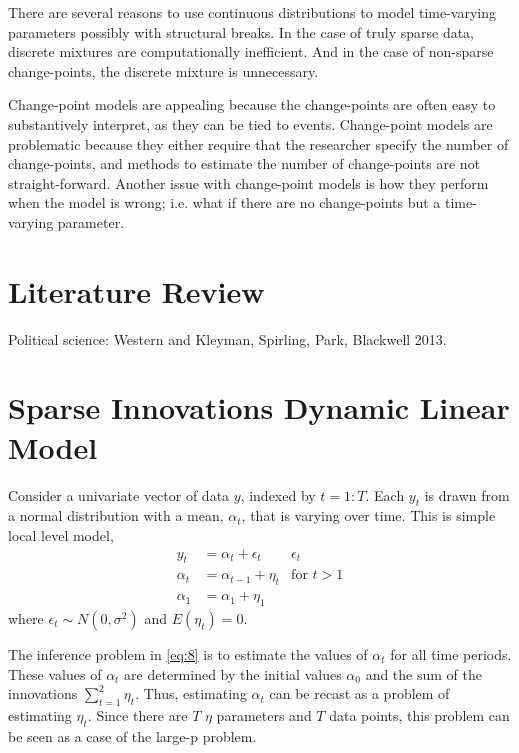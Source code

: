 \documentclass{article}
\begin{document}
There are several reasons to use continuous distributions to model time-varying parameters possibly with structural breaks.
In the case of truly sparse data, discrete mixtures are computationally inefficient. 
And in the case of non-sparse change-points, the discrete mixture is unnecessary.

Change-point models are appealing because the change-points are often easy to substantively interpret, as they can be tied to events.
Change-point models are problematic because they either require that the researcher specify the number of change-points, and methods to estimate the number of change-points are not straight-forward.
Another issue with change-point models is how they perform when the
model is wrong; i.e. what if there are no change-points but a
time-varying parameter.

\section{Literature Review}
\label{sec:literature-review}

Political science: Western and Kleyman, Spirling, Park, Blackwell 2013.

\section{Sparse Innovations Dynamic Linear Model}

Consider a univariate vector of data $y$, indexed by $t = 1:T$.
Each $y_{t}$ is drawn from a normal distribution with a mean, $\alpha_{t}$, that is varying over time.
This is simple local level model,
\begin{align}
  \label{eq:8}
  y_t &= \alpha_t + \epsilon_t & \epsilon_{t}  \\
  \label{eq:14}
  \alpha_t &= \alpha_{t-1} + \eta_{t} & \text{for $t > 1$} \\
  \label{eq:19}
  \alpha_1 &= \alpha_{1} + \eta_{1}
\end{align}
where $\epsilon_{t} \sim N(0, \sigma^{2})$ and $E(\eta_{t}) = 0$.

The inference problem in \eqref{eq:8} is to estimate the values of $\alpha_{t}$ for all time periods.
These values of $\alpha_{t}$ are determined by the initial values $\alpha_{0}$ and the sum of the innovations $\sum_{t=1}^{2} \eta_{t}$.
Thus, estimating $\alpha_{t}$ can be recast as a problem of estimating $\eta_{t}$.
Since there are $T$ $\eta$ parameters and $T$ data points, this problem can be seen as a case of the large-p problem.
\end{document}
